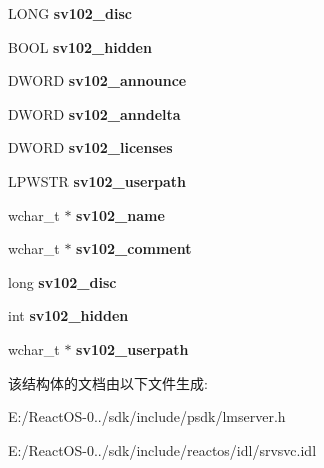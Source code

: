 \begin{DoxyCompactItemize}
L\+O\+NG {\bfseries sv102\+\_\+disc}
\item 
\mbox{\label{struct___s_e_r_v_e_r___i_n_f_o__102_ac640d49b0cae87c753bccd50ce5c6e84}} 
B\+O\+OL {\bfseries sv102\+\_\+hidden}
\item 
\mbox{\label{struct___s_e_r_v_e_r___i_n_f_o__102_ad6765adf7dc70670ac848a529d1f6969}} 
D\+W\+O\+RD {\bfseries sv102\+\_\+announce}
\item 
\mbox{\label{struct___s_e_r_v_e_r___i_n_f_o__102_a8403afc5023753de6ea6745bfbb416cf}} 
D\+W\+O\+RD {\bfseries sv102\+\_\+anndelta}
\item 
\mbox{\label{struct___s_e_r_v_e_r___i_n_f_o__102_a848ecf61b86954c276af4922b6b77f09}} 
D\+W\+O\+RD {\bfseries sv102\+\_\+licenses}
\item 
\mbox{\label{struct___s_e_r_v_e_r___i_n_f_o__102_ae70331db168c6fb35cfc6470a7a7b8e2}} 
L\+P\+W\+S\+TR {\bfseries sv102\+\_\+userpath}
\item 
\mbox{\label{struct___s_e_r_v_e_r___i_n_f_o__102_ad1c0515172f06cfe99b0eb1bfc31ddff}} 
wchar\+\_\+t $\ast$ {\bfseries sv102\+\_\+name}
\item 
\mbox{\label{struct___s_e_r_v_e_r___i_n_f_o__102_a313581e5944424592614ca9e0ad13b5d}} 
wchar\+\_\+t $\ast$ {\bfseries sv102\+\_\+comment}
\item 
\mbox{\label{struct___s_e_r_v_e_r___i_n_f_o__102_a2c39850fea4ddd6e117e0e21c2fe7551}} 
long {\bfseries sv102\+\_\+disc}
\item 
\mbox{\label{struct___s_e_r_v_e_r___i_n_f_o__102_a93c8b4a9598bf3a8c56fab84efed6f8e}} 
int {\bfseries sv102\+\_\+hidden}
\item 
\mbox{\label{struct___s_e_r_v_e_r___i_n_f_o__102_a8b03ea77cc950c625ff7ce0bee78e09a}} 
wchar\+\_\+t $\ast$ {\bfseries sv102\+\_\+userpath}
\end{DoxyCompactItemize}


该结构体的文档由以下文件生成\+:\begin{DoxyCompactItemize}
\item 
E\+:/\+React\+O\+S-\/0../sdk/include/psdk/lmserver.\+h\item 
E\+:/\+React\+O\+S-\/0../sdk/include/reactos/idl/srvsvc.\+idl\end{DoxyCompactItemize}

